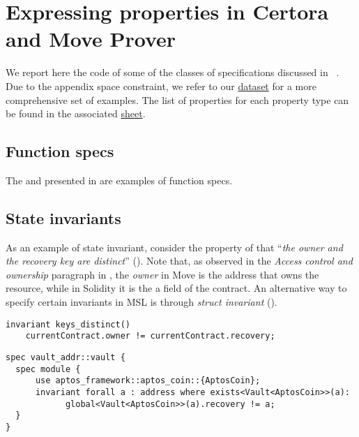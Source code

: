 \section{Expressing properties in Certora and Move Prover}
\label{sec:properties}

We report here the code of some of the classes of specifications discussed in ~. Due to the appendix space constraint, we refer to our \href{\githubaddress}{dataset} for a more comprehensive set of examples. The list of properties for each property type can be found  in the associated \href{\sheeturl}{sheet}.

\subsection{Function specs}
 

The   and  presented in  are examples of function specs.






\subsection{State invariants}
\label{sec:appendix:stateInv}

As an example of state invariant, consider the property of  that ``\emph{the owner and the recovery key are distinct}'' ().
Note that, as observed in the \emph{Access control and ownership} paragraph in , the \emph{owner} in Move is the address that owns the  resource, while in Solidity it is the a field of the contract. 
An alternative way to specify certain invariants in MSL is through \emph{struct invariant} (\eg {}).


\begin{lstlisting}[language=cvl,caption={Specification of \specurl{vault}{keys-distinct} in CVL}]
invariant keys_distinct()
    currentContract.owner != currentContract.recovery;
\end{lstlisting}


\begin{lstlisting}[language=move,caption={Specification of \specurl{vault}{keys-distinct} in MSL}]
spec vault_addr::vault {
  spec module { 
      use aptos_framework::aptos_coin::{AptosCoin};
      invariant forall a : address where exists<Vault<AptosCoin>>(a):
      		global<Vault<AptosCoin>>(a).recovery != a;
  }
}
\end{lstlisting}

